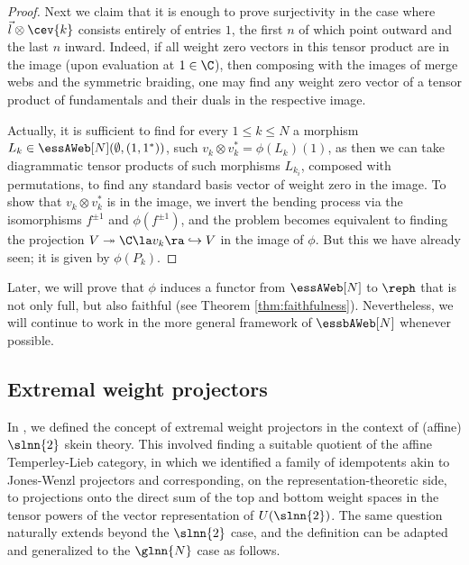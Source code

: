 \begin{proof}
    Next we claim that it is enough to prove surjectivity in the case where
    $\vec{l}\otimes \cev{k}$ consists entirely of entries $1$, the first $n$ of
    which point outward and the last $n$ inward. Indeed, if all weight zero
    vectors in this tensor product are in the image (upon evaluation at $1\in
    \C$), then composing with the images of merge webs and the symmetric
    braiding, one may find any weight zero vector of a tensor product of
    fundamentals and their duals in the respective image.
    
Actually, it is sufficient to find for every $1\leq k\leq N$ a morphism $L_k\in
\essAWeb[N](\emptyset,(1,1^*))$, such $v_k\otimes v_k^*=\phi(L_k)(1)$, as then
we can take diagrammatic tensor products of such morphisms $L_{k_i}$, composed
with permutations, to find any standard basis vector of weight zero in the
image. To show that $v_k\otimes v_k^*$ is in the image, we invert the bending
process via the isomorphisms $f^{\pm 1}$ and $\phi(f^{\pm 1})$, and the problem
becomes equivalent to finding the projection $V \twoheadrightarrow \C\la
v_k\ra\hookrightarrow V$ in the image of $\phi$. But this we have already seen;
it is given by $\phi(P_k)$.
\end{proof}


Later, we will prove that $\phi$ induces a functor from $\essAWeb[N]$ to $\reph$
that is not only full, but also faithful (see Theorem \ref{thm:faithfulness}).
Nevertheless, we will continue to work in the more general framework of
$\essbAWeb[N]$ whenever possible.



\subsection{Extremal weight projectors}
\label{sec:EWP}
In \cite{QW}, we defined the concept of extremal weight projectors in the
context of (affine) $\slnn{2}$ skein theory. This involved finding a suitable
quotient of the affine Temperley-Lieb category, in which we identified a family
of idempotents akin to Jones-Wenzl projectors and corresponding, on the
representation-theoretic side, to projections onto the direct sum of the top and
bottom weight spaces in the tensor powers of the vector representation of
$U(\slnn{2})$. The same question naturally extends beyond the $\slnn{2}$ case,
and the definition can be adapted and generalized to the $\glnn{N}$ case as
follows.

